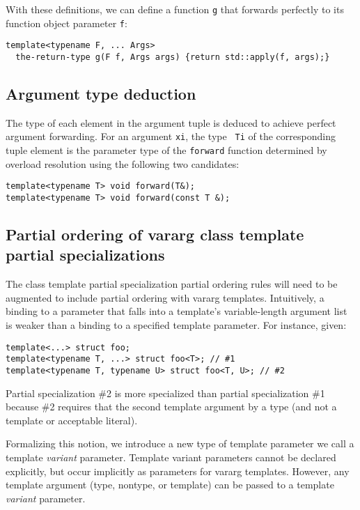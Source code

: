 \documentclass{article}
\begin{document}
With these definitions, we can define a function {\tt g} that forwards
perfectly to its function object parameter {\tt f}:
\begin{verbatim}
template<typename F, ... Args>
  the-return-type g(F f, Args args) {return std::apply(f, args);}
\end{verbatim}

\subsection{Argument type deduction}
The type of each element in the argument tuple is deduced to achieve
perfect argument forwarding. For an argument {\tt xi}, the type {\tt
  Ti} of the corresponding tuple element is the parameter type of the
{\tt forward} function determined by overload resolution using the
following two candidates:
\begin{verbatim}
template<typename T> void forward(T&);
template<typename T> void forward(const T &);
\end{verbatim}

\subsection{Partial ordering of vararg class template partial specializations}
The class template partial specialization partial ordering rules will
need to be augmented to include partial ordering with vararg
templates. Intuitively, a binding to a parameter that falls into a
template's variable-length argument list is weaker than a binding to a
specified template parameter. For instance, given:

\begin{verbatim}
template<...> struct foo;
template<typename T, ...> struct foo<T>; // #1
template<typename T, typename U> struct foo<T, U>; // #2
\end{verbatim}

Partial specialization \#2 is more specialized than partial
specialization \#1 because \#2 requires that the second template
argument by a type (and not a template or acceptable
literal). 

Formalizing this notion, we introduce a new type of template
parameter we call a template {\em variant} parameter. Template variant
parameters cannot be declared explicitly, but occur implicitly as
parameters for vararg templates. However, any template argument
(type, nontype, or template) can be passed to a template {\em variant}
parameter. 
\end{document}
